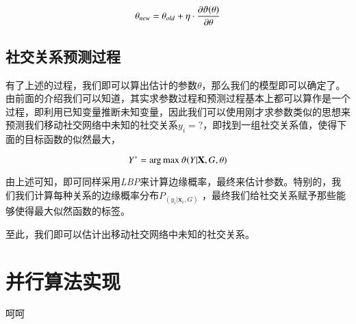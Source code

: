 \begin{equation}
\label{eq-learning}
\theta_{new} = \theta_{old} + \eta \cdot \frac{\partial \vartheta(\theta)}{\partial \theta} \\
\end{equation}


\subsection{社交关系预测过程}

有了上述的过程，我们即可以算出估计的参数$\theta$，那么我们的模型即可以确定了。由前面的介绍我们可以知道，其实求参数过程和预测过程基本上都可以算作是一个过程，即利用已知变量推断未知变量，因此我们可以使用刚才求参数类似的思想来预测我们移动社交网络中未知的社交关系${y_i = ?}$，即找到一组社交关系值，使得下面的目标函数的似然最大，

\begin{equation}
Y^{\ast} = \arg \max \vartheta(Y|\textbf{X},G,\theta) \\
\end{equation}

由上述可知，即可同样采用\textit{LBP}来计算边缘概率，最终来估计参数。特别的，我们我们计算每种关系的边缘概率分布$P_(y_i | \textbf{x}_i, G)$ ，最终我们给社交关系赋予那些能够使得最大似然函数的标签。

至此，我们即可以估计出移动社交网络中未知的社交关系。




\section{并行算法实现}
呵呵



































